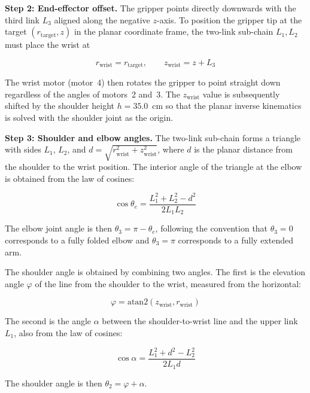 \textbf{Step 2: End-effector offset.} The gripper points 
directly downwards with the third link $L_3$ aligned along the 
negative $z$-axis. To position the gripper tip at the target 
$(r_{\mathrm{target}}, z)$ in the planar coordinate frame, the 
two-link sub-chain $L_1, L_2$ must place the wrist at

\begin{equation}
    r_{\mathrm{wrist}} = r_{\mathrm{target}}, \qquad 
    z_{\mathrm{wrist}} = z + L_3
\end{equation}

The wrist motor (motor~4) then rotates the gripper to point 
straight down regardless of the angles of motors~2 and~3. The 
$z_{\mathrm{wrist}}$ value is subsequently shifted by the 
shoulder height $h = 35.0$~cm so that the planar inverse 
kinematics is solved with the shoulder joint as the origin.

\textbf{Step 3: Shoulder and elbow angles.} The two-link 
sub-chain forms a triangle with sides $L_1$, $L_2$, and 
$d = \sqrt{r_{\mathrm{wrist}}^2 + z_{\mathrm{wrist}}^2}$, where 
$d$ is the planar distance from the shoulder to the wrist 
position. The interior angle of the triangle at the elbow is 
obtained from the law of cosines:

\begin{equation}
    \cos\theta_e = \frac{L_1^2 + L_2^2 - d^2}{2 L_1 L_2}
\end{equation}

The elbow joint angle is then $\theta_3 = \pi - \theta_e$, 
following the convention that $\theta_3 = 0$ corresponds to a 
fully folded elbow and $\theta_3 = \pi$ corresponds to a fully 
extended arm.

The shoulder angle is obtained by combining two angles. The 
first is the elevation angle $\varphi$ of the line from the 
shoulder to the wrist, measured from the horizontal:

\begin{equation}
    \varphi = \mathrm{atan2}(z_{\mathrm{wrist}}, r_{\mathrm{wrist}})
\end{equation}

The second is the angle $\alpha$ between the shoulder-to-wrist 
line and the upper link $L_1$, also from the law of cosines:

\begin{equation}
    \cos\alpha = \frac{L_1^2 + d^2 - L_2^2}{2 L_1 d}
\end{equation}

The shoulder angle is then $\theta_2 = \varphi + \alpha$.

